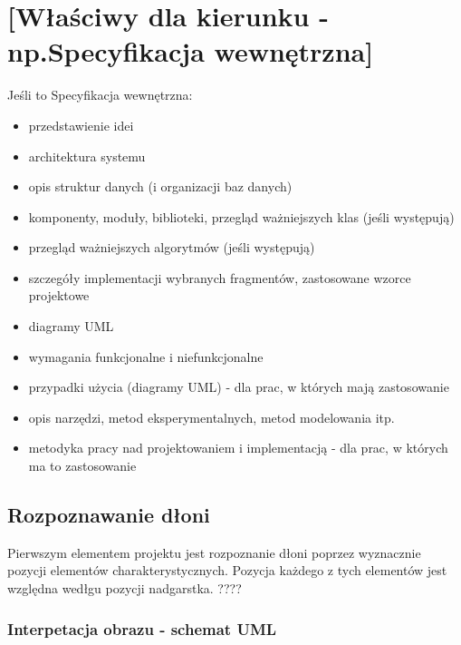 \chapter{[Właściwy dla kierunku - np.Specyfikacja wewnętrzna]}
Jeśli to Specyfikacja wewnętrzna:
\begin{itemize}
\item przedstawienie idei
\item architektura systemu
\item opis struktur danych (i organizacji baz danych)
\item komponenty, moduły, biblioteki, przegląd ważniejszych klas (jeśli występują)
\item przegląd ważniejszych algorytmów (jeśli występują)
\item szczegóły implementacji wybranych fragmentów, zastosowane wzorce projektowe
\item diagramy UML
\end{itemize}


\begin{itemize}
    \item wymagania funkcjonalne i niefunkcjonalne
    \item przypadki użycia (diagramy UML) - dla prac, w których mają zastosowanie
    \item opis narzędzi, metod eksperymentalnych, metod modelowania itp.
    \item metodyka pracy nad projektowaniem i implementacją - dla prac, w których ma to zastosowanie
    \end{itemize}
    
    \section{Rozpoznawanie dłoni}
    
    \quad Pierwszym elementem projektu jest rozpoznanie dłoni poprzez wyznacznie pozycji elementów charakterystycznych. Pozycja każdego z tych elementów jest względna wedłgu pozycji nadgarstka. ????

    \subsection{Interpetacja obrazu - schemat UML}

